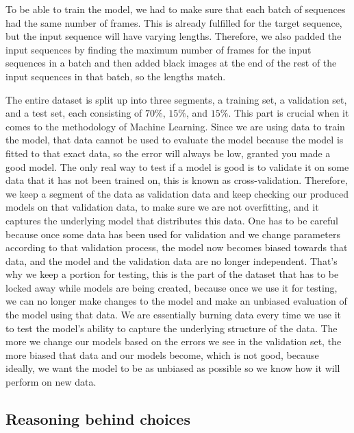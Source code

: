 \documentclass[a4paper,12pt]{article}
\begin{document}
To be able to train the model, we had to make sure that each batch of sequences had the same number of frames. This is already fulfilled for the target sequence, but the input sequence will have varying lengths. Therefore, we also padded the input sequences by finding the maximum number of frames for the input sequences in a batch and then added black images at the end of the rest of the input sequences in that batch, so the lengths match.


The entire dataset is split up into three segments, a training set, a validation set, and a test set, each consisting of $70\%$, $15\%$, and $15\%$. This part is crucial when it comes to the methodology of Machine Learning. Since we are using data to train the model, that data cannot be used to evaluate the model because the model is fitted to that exact data, so the error will always be low, granted you made a good model. The only real way to test if a model is good is to validate it on some data that it has not been trained on, this is known as cross-validation. Therefore, we keep a segment of the data as validation data and keep checking our produced models on that validation data, to make sure we are not overfitting, and it captures the underlying model that distributes this data. 
One has to be careful because once some data has been used for validation and we change parameters according to that validation process, the model now becomes biased towards that data, and the model and the validation data are no longer independent. That's why we keep a portion for testing, this is the part of the dataset that has to be locked away while models are being created, because once we use it for testing, we can no longer make changes to the model and make an unbiased evaluation of the model using that data. We are essentially burning data every time we use it to test the model's ability to capture the underlying structure of the data. The more we change our models based on the errors we see in the validation set, the more biased that data and our models become, which is not good, because ideally, we want the model to be as unbiased as possible so we know how it will perform on new data.

\subsection{Reasoning behind choices}
\end{document}
